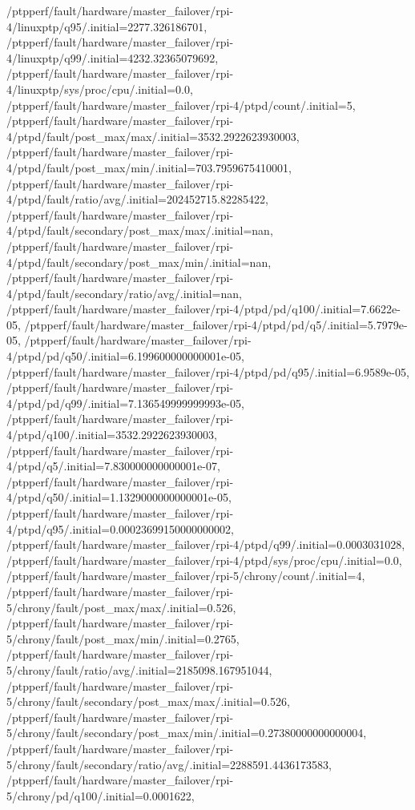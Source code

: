 {    /ptpperf/fault/hardware/master_failover/rpi-4/linuxptp/q95/.initial=2277.326186701,
    /ptpperf/fault/hardware/master_failover/rpi-4/linuxptp/q99/.initial=4232.32365079692,
    /ptpperf/fault/hardware/master_failover/rpi-4/linuxptp/sys/proc/cpu/.initial=0.0,
    /ptpperf/fault/hardware/master_failover/rpi-4/ptpd/count/.initial=5,
    /ptpperf/fault/hardware/master_failover/rpi-4/ptpd/fault/post_max/max/.initial=3532.2922623930003,
    /ptpperf/fault/hardware/master_failover/rpi-4/ptpd/fault/post_max/min/.initial=703.7959675410001,
    /ptpperf/fault/hardware/master_failover/rpi-4/ptpd/fault/ratio/avg/.initial=202452715.82285422,
    /ptpperf/fault/hardware/master_failover/rpi-4/ptpd/fault/secondary/post_max/max/.initial=nan,
    /ptpperf/fault/hardware/master_failover/rpi-4/ptpd/fault/secondary/post_max/min/.initial=nan,
    /ptpperf/fault/hardware/master_failover/rpi-4/ptpd/fault/secondary/ratio/avg/.initial=nan,
    /ptpperf/fault/hardware/master_failover/rpi-4/ptpd/pd/q100/.initial=7.6622e-05,
    /ptpperf/fault/hardware/master_failover/rpi-4/ptpd/pd/q5/.initial=5.7979e-05,
    /ptpperf/fault/hardware/master_failover/rpi-4/ptpd/pd/q50/.initial=6.199600000000001e-05,
    /ptpperf/fault/hardware/master_failover/rpi-4/ptpd/pd/q95/.initial=6.9589e-05,
    /ptpperf/fault/hardware/master_failover/rpi-4/ptpd/pd/q99/.initial=7.136549999999993e-05,
    /ptpperf/fault/hardware/master_failover/rpi-4/ptpd/q100/.initial=3532.2922623930003,
    /ptpperf/fault/hardware/master_failover/rpi-4/ptpd/q5/.initial=7.830000000000001e-07,
    /ptpperf/fault/hardware/master_failover/rpi-4/ptpd/q50/.initial=1.1329000000000001e-05,
    /ptpperf/fault/hardware/master_failover/rpi-4/ptpd/q95/.initial=0.00023699150000000002,
    /ptpperf/fault/hardware/master_failover/rpi-4/ptpd/q99/.initial=0.0003031028,
    /ptpperf/fault/hardware/master_failover/rpi-4/ptpd/sys/proc/cpu/.initial=0.0,
    /ptpperf/fault/hardware/master_failover/rpi-5/chrony/count/.initial=4,
    /ptpperf/fault/hardware/master_failover/rpi-5/chrony/fault/post_max/max/.initial=0.526,
    /ptpperf/fault/hardware/master_failover/rpi-5/chrony/fault/post_max/min/.initial=0.2765,
    /ptpperf/fault/hardware/master_failover/rpi-5/chrony/fault/ratio/avg/.initial=2185098.167951044,
    /ptpperf/fault/hardware/master_failover/rpi-5/chrony/fault/secondary/post_max/max/.initial=0.526,
    /ptpperf/fault/hardware/master_failover/rpi-5/chrony/fault/secondary/post_max/min/.initial=0.27380000000000004,
    /ptpperf/fault/hardware/master_failover/rpi-5/chrony/fault/secondary/ratio/avg/.initial=2288591.4436173583,
    /ptpperf/fault/hardware/master_failover/rpi-5/chrony/pd/q100/.initial=0.0001622,
}

